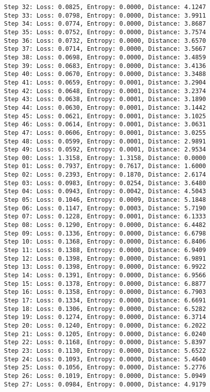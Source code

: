 \documentclass[11pt]{article}
\begin{document}
\begin{Verbatim}[commandchars=\\\{\}]
Step 32: Loss: 0.0825, Entropy: 0.0000, Distance: 4.1247
Step 33: Loss: 0.0798, Entropy: 0.0000, Distance: 3.9911
Step 34: Loss: 0.0774, Entropy: 0.0000, Distance: 3.8687
Step 35: Loss: 0.0752, Entropy: 0.0000, Distance: 3.7574
Step 36: Loss: 0.0732, Entropy: 0.0000, Distance: 3.6570
Step 37: Loss: 0.0714, Entropy: 0.0000, Distance: 3.5667
Step 38: Loss: 0.0698, Entropy: 0.0000, Distance: 3.4859
Step 39: Loss: 0.0683, Entropy: 0.0000, Distance: 3.4136
Step 40: Loss: 0.0670, Entropy: 0.0000, Distance: 3.3488
Step 41: Loss: 0.0659, Entropy: 0.0001, Distance: 3.2904
Step 42: Loss: 0.0648, Entropy: 0.0001, Distance: 3.2374
Step 43: Loss: 0.0638, Entropy: 0.0001, Distance: 3.1890
Step 44: Loss: 0.0630, Entropy: 0.0001, Distance: 3.1442
Step 45: Loss: 0.0621, Entropy: 0.0001, Distance: 3.1025
Step 46: Loss: 0.0614, Entropy: 0.0001, Distance: 3.0631
Step 47: Loss: 0.0606, Entropy: 0.0001, Distance: 3.0255
Step 48: Loss: 0.0599, Entropy: 0.0001, Distance: 2.9891
Step 49: Loss: 0.0592, Entropy: 0.0001, Distance: 2.9534
Step 00: Loss: 1.3158, Entropy: 1.3158, Distance: 0.0000
Step 01: Loss: 0.7937, Entropy: 0.7617, Distance: 1.6000
Step 02: Loss: 0.2393, Entropy: 0.1870, Distance: 2.6174
Step 03: Loss: 0.0983, Entropy: 0.0254, Distance: 3.6480
Step 04: Loss: 0.0943, Entropy: 0.0042, Distance: 4.5043
Step 05: Loss: 0.1046, Entropy: 0.0009, Distance: 5.1848
Step 06: Loss: 0.1147, Entropy: 0.0003, Distance: 5.7190
Step 07: Loss: 0.1228, Entropy: 0.0001, Distance: 6.1333
Step 08: Loss: 0.1290, Entropy: 0.0000, Distance: 6.4482
Step 09: Loss: 0.1336, Entropy: 0.0000, Distance: 6.6798
Step 10: Loss: 0.1368, Entropy: 0.0000, Distance: 6.8406
Step 11: Loss: 0.1388, Entropy: 0.0000, Distance: 6.9409
Step 12: Loss: 0.1398, Entropy: 0.0000, Distance: 6.9891
Step 13: Loss: 0.1398, Entropy: 0.0000, Distance: 6.9922
Step 14: Loss: 0.1391, Entropy: 0.0000, Distance: 6.9566
Step 15: Loss: 0.1378, Entropy: 0.0000, Distance: 6.8877
Step 16: Loss: 0.1358, Entropy: 0.0000, Distance: 6.7903
Step 17: Loss: 0.1334, Entropy: 0.0000, Distance: 6.6691
Step 18: Loss: 0.1306, Entropy: 0.0000, Distance: 6.5282
Step 19: Loss: 0.1274, Entropy: 0.0000, Distance: 6.3714
Step 20: Loss: 0.1240, Entropy: 0.0000, Distance: 6.2022
Step 21: Loss: 0.1205, Entropy: 0.0000, Distance: 6.0240
Step 22: Loss: 0.1168, Entropy: 0.0000, Distance: 5.8397
Step 23: Loss: 0.1130, Entropy: 0.0000, Distance: 5.6522
Step 24: Loss: 0.1093, Entropy: 0.0000, Distance: 5.4640
Step 25: Loss: 0.1056, Entropy: 0.0000, Distance: 5.2776
Step 26: Loss: 0.1019, Entropy: 0.0000, Distance: 5.0949
Step 27: Loss: 0.0984, Entropy: 0.0000, Distance: 4.9179

\end{Verbatim}
\end{document}

